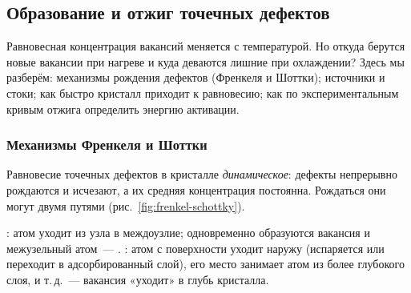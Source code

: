 \subsection{Образование и отжиг точечных дефектов}\label{ssec:annealing}

\begin{orientir}
Равновесная концентрация вакансий меняется с температурой. Но откуда
берутся новые вакансии при нагреве и куда деваются лишние при охлаждении?
Здесь мы разберём: механизмы рождения дефектов (Френкеля и Шоттки);
источники и стоки; как быстро кристалл приходит к равновесию; как по
экспериментальным кривым отжига определить энергию активации.
\end{orientir}

\subsubsection{Механизмы Френкеля и Шоттки}

Равновесие точечных дефектов в кристалле \emph{динамическое}: дефекты
непрерывно рождаются и исчезают, а их средняя концентрация постоянна.
Рождаться они могут двумя путями (рис.~\ref{fig:frenkel-schottky}).

\begin{opredelenie}
: атом уходит из узла в междоузлие; одновременно
образуются вакансия и межузельный атом~— .
: атом с поверхности уходит наружу (испаряется или
переходит в адсорбированный слой), его место занимает атом из более
глубокого слоя, и т.\,д.~— вакансия «уходит» в глубь кристалла.
\end{opredelenie}

